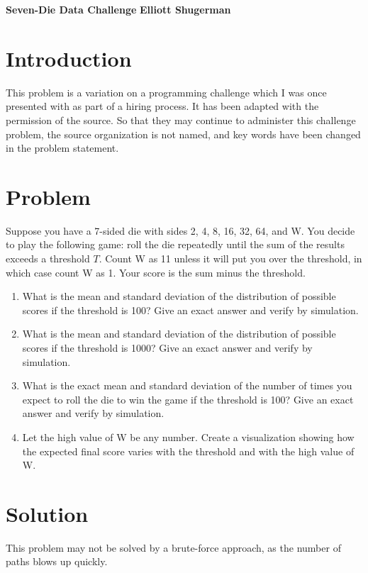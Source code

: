 \documentclass[a4paper, 11pt]{article}
\begin{document}
\large\textbf{Seven-Die Data Challenge } \hfill \textbf{Elliott Shugerman} \\


\section{Introduction}This problem is a variation on a programming challenge which I was once presented with as part of a hiring process. It has been adapted with the permission of the source. So that they may continue to administer this challenge problem, the source organization is not named, and key words have been changed in the problem statement.
 
\section{Problem}
Suppose you have a 7-sided die with sides 2, 4, 8, 16, 32, 64, and W. You decide to play the following game: roll the die repeatedly until the sum of the results exceeds a threshold $T$. Count W as 11 unless it will put you over the threshold, in which case count W as 1. Your score is the sum minus the threshold.


\begin{enumerate}[\hspace{5mm}I.]
	\item What is the mean and standard deviation of the distribution of possible scores if the threshold is 100? Give an exact answer and verify by simulation.
	\item What is the mean and standard deviation of the distribution of possible scores if the threshold is 1000? Give an exact answer and verify by simulation.
	\item What is the exact mean and standard deviation of the number of times you expect to roll the die to win the game if the threshold is 100? Give an exact answer and verify by simulation.
	\item Let the high value of W be any number. Create a visualization showing how the expected final score varies with the threshold and with the high value of W.

\end{enumerate}
 
\section{Solution}
This problem may not be solved by a brute-force approach, as the number of paths blows up quickly.
\end{document}
